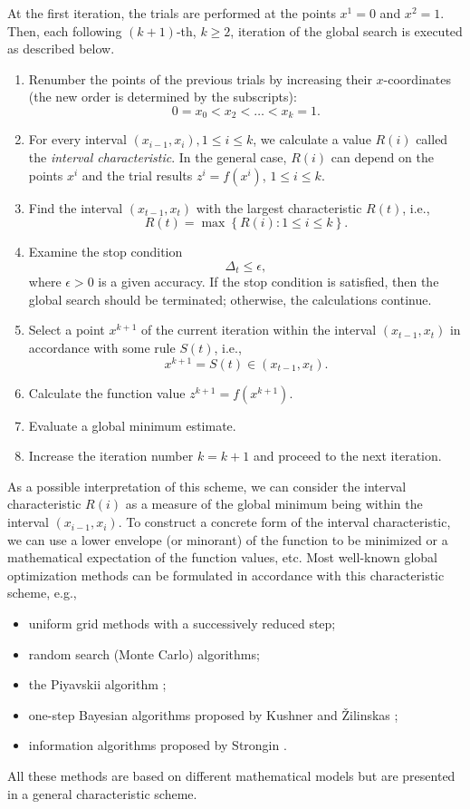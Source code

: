 \documentclass{svproc}
\begin{document}
At the first iteration, the trials are performed at the points $x^1 = 0$ and $x^2 = 1$. Then, each following $(k+1)$-th, $k \geq 2$, iteration of the global search is executed as described below.
\begin{enumerate}
	\item
Renumber the points of the previous trials by increasing their $x$-coordinates (the new order is determined by the subscripts):
\[
0=x_0<x_2<\ldots<x_{k}=1.
\]

	\item
For every interval $(x_{i-1},x_i), 1\leq i\leq k$, we calculate a value $R(i)$ called the \textit{interval characteristic}. In the general case, $R(i)$ can depend on the points $x^i$ and the trial results $z^i=f(x^i)$, $1 \leq i \leq k$.

	\item
Find the interval $(x_{t-1},x_t)$ with the largest characteristic $R(t)$, i.e.,
\[
R(t) = \max \left\{ R(i) : 1\leq i\leq k \right\}.
\]

	\item
Examine the stop condition
\[
\Delta_t \leq \epsilon ,
\]
where $\epsilon>0$ is a given accuracy. If the stop condition is satisfied, then the global search should be terminated; otherwise, the calculations continue.

	\item
Select a point $x^{k+1}$ of the current iteration within the interval $(x_{t-1},x_t)$ in accordance with some rule $S(t)$, i.e.,
\[
x^{k+1} = S(t)\in(x_{t-1},x_t).
\]
	
	\item
Calculate the function value $z^{k+1} = f(x^{k+1})$.

	\item
Evaluate a global minimum estimate.

	\item
Increase the iteration number $k=k+1$ and proceed to the next iteration.
\end{enumerate}

As a possible interpretation of this scheme, we can consider the interval characteristic $R(i)$ as a measure of the global minimum being within the interval
$(x_{i-1},x_i)$.
To construct a concrete form of the interval characteristic, we can use a lower envelope (or minorant) of the function to be minimized or a mathematical expectation of the function values, etc.
Most well-known global optimization methods can be formulated in accordance with this characteristic scheme, e.g.,
\begin{itemize}
\item uniform grid methods with a successively reduced step;
\item random search (Monte Carlo) algorithms;
\item the Piyavskii algorithm \cite{Piyavskii1972};
\item one-step Bayesian algorithms proposed by Kushner and \v{Z}ilinskas \cite{Zilinskas1989};
\item information algorithms proposed by Strongin \cite{Strongin2000}.
\end{itemize}
All these methods are based on different mathematical models but are presented in a general characteristic scheme.
\end{document}
